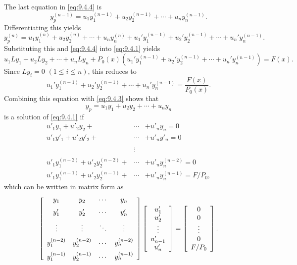 The last equation in \eqref{eq:9.4.4} is
\[
  y_{p}^{(n-1)}=u_{1}y_{1}^{(n-1)}+u_{2}y_{2}^{(n-1)}+\cdots+u_{n}y_{n}^{(n-1)}.
\]
Differentiating this yields
\[
  y_{p}^{(n)}=u_{1}y_{1}^{(n)}+u_{2}y_{2}^{(n)}+\cdots+u_{n}y_{n}^{(n)}+ u_{1}'y_{1}^{(n-1)}+u_{2}'y_{2}^{(n-1)}+\cdots+u_{n}'y_{n}^{(n-1)}.
\]
Substituting this and \eqref{eq:9.4.4} into \eqref{eq:9.4.1} yields
\[
  u_{1}Ly_{1}+u_{2}Ly_{2}+\cdots+u_{n}Ly_{n}+P_{0}(x)\left( u_{1}'y_{1}^{(n-1)}+u_{2}'y_{2}^{(n-1)}+\cdots+u_{n}'y_{n}^{(n-1)}\right)=F(x).
\]
Since $Ly_{i}=0$ $(1\le i\le n)$, this reduces to
\[
  u_{1}'y_{1}^{(n-1)}+u_{2}'y_{2}^{(n-1)}+\cdots+u_{n}'y_{n}^{(n-1)}=\frac{F(x)}{P_{0}(x)}.
\]
Combining this equation with \eqref{eq:9.4.3} shows that
\[
  y_{p}=u_{1}y_{1}+u_{2}y_{2}+\cdots+u_{n}y_{n}
\]
is a solution of \eqref{eq:9.4.1} if
\[
  \begin{array}{rcl}
    u'_{1}y_{1}+u'_{2}y_{2}+                        & \cdots & +u'_{n}y_{n}=0                         \\
    u'_{1}y'_{1}+u'_{2}y'_{2}+                      & \cdots & +u'_{n}y'_{n}=0                        \\
    \phantom{u'_{1}y^{(n_{1})}+u'_{2}y_{2}^{(n-1)}} & \vdots & \phantom{\cdots+u'_{n}y^{(n-1)}_{n}=q} \\
    u'_{1}y_{1}^{(n-2)}+u'_{2}y^{(n-2)}_{2}+        & \cdots & +u'_{n}y^{(n-2)}_{n} =0                \\
    u'_{1}y^{(n-1)}_{1}+u'_{2}y^{(n-1)}_{2}+        & \cdots & +u'_{n} y^{(n-1)}_{n}=F/P_{0},
  \end{array}
\]
which can be written in matrix form as
\begin{equation}
  \label{eq:9.4.5}\left[
  \begin{array}{cccc}
    y_{1}         & y_{2}         & \cdots & y_{n}         \\[2\jot]
    y'_{1}        & y'_{2}        & \cdots & y_{n}'        \\[2\jot]
    \vdots        & \vdots        & \ddots & \vdots        \\[2\jot]
    y_{1}^{(n-2)} & y_{2}^{(n-2)} & \cdots & y_{n}^{(n-2)} \\[2\jot]
    y_{1}^{(n-1)} & y_{2}^{(n-1)} & \cdots & y_{n}^{(n-1)}
  \end{array}\right] \left[
  \begin{array}{c}
    u_{1}'   \\
    u_{2}'   \\
    \vdots   \\
    u_{n-1}' \\
    u_{n}'
  \end{array}
  \right]= \left[
  \begin{array}{c}
    0       \\
    0       \\
    \vdots  \\
    0       \\
    F/P_{0}
  \end{array}\right].
\end{equation}
